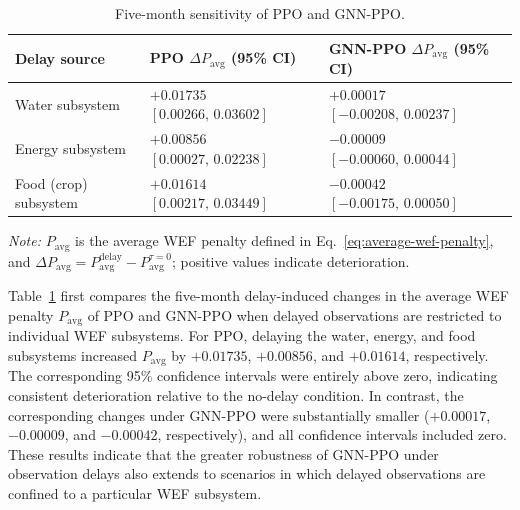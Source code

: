\documentclass [a4paper,fleqn] {cas-dc}
\begin{document}
\begin{table}[pos=ht]
\centering
\caption{Five-month sensitivity of PPO and GNN-PPO.}
\label{tab:sensitivity}
\footnotesize
\setlength{\tabcolsep}{2pt}
\renewcommand{\arraystretch}{1.12}
\begin{tabularx}{\columnwidth}{@{}>{\raggedright\arraybackslash}X
  >{\centering\arraybackslash}m{}
  >{\centering\arraybackslash}m{}@{}}
\toprule
Delay source 
& \shortstack{PPO $\Delta P_{\mathrm{avg}}$\\(95\% CI)}
& \shortstack{GNN-PPO $\Delta P_{\mathrm{avg}}$\\(95\% CI)} \\
\midrule

Water subsystem
& \shortstack{$+0.01735$\\$[0.00266,\,0.03602]$}
& \shortstack{$+0.00017$\\$[-0.00208,\,0.00237]$} \\

Energy subsystem
& \shortstack{$+0.00856$\\$[0.00027,\,0.02238]$}
& \shortstack{$-0.00009$\\$[-0.00060,\,0.00044]$} \\

Food (crop) subsystem
& \shortstack{$+0.01614$\\$[0.00217,\,0.03449]$}
& \shortstack{$-0.00042$\\$[-0.00175,\,0.00050]$} \\


\bottomrule
\end{tabularx}

\par\vspace{2pt}
\begin{minipage}{\columnwidth}
\raggedright
\textit{Note:} $P_{\mathrm{avg}}$ is the average WEF penalty defined in Eq.~\eqref{eq:average-wef-penalty}, and $\Delta P_{\mathrm{avg}}=P_{\mathrm{avg}}^{\mathrm{delay}}-P_{\mathrm{avg}}^{\tau=0}$; positive values indicate deterioration.
\end{minipage}
\end{table}

Table~\ref{tab:sensitivity} first compares the five-month delay-induced changes in the average WEF penalty $P_{\mathrm{avg}}$ of PPO and GNN-PPO when delayed observations are restricted to individual WEF subsystems. For PPO, delaying the water, energy, and food subsystems increased $P_{\mathrm{avg}}$ by $+0.01735$, $+0.00856$, and $+0.01614$, respectively. The corresponding 95\% confidence intervals were entirely above zero, indicating consistent deterioration relative to the no-delay condition. In contrast, the corresponding changes under GNN-PPO were substantially smaller ($+0.00017$, $-0.00009$, and $-0.00042$, respectively), and all confidence intervals included zero. These results indicate that the greater robustness of GNN-PPO under observation delays also extends to scenarios in which delayed observations are confined to a particular WEF subsystem.
\end{document}
